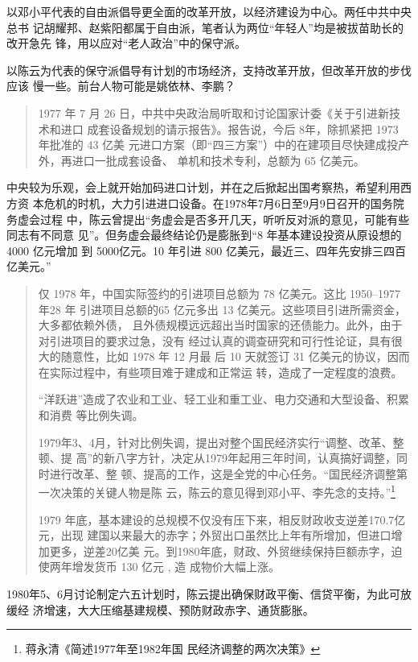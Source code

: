 以邓小平代表的自由派倡导更全面的改革开放，以经济建设为中心。两任中共中央总书
记胡耀邦、赵紫阳都属于自由派，笔者认为两位“年轻人”均是被拔苗助长的改开急先
锋，用以应对“老人政治”中的保守派。

以陈云为代表的保守派倡导有计划的市场经济，支持改革开放，但改革开放的步伐应该
慢一些。前台人物可能是姚依林、李鹏？

\begin{quotation}
  1977 年 7 月 26 日，中共中央政治局听取和讨论国家计委《关于引进新技术和进口
  成套设备规划的请示报告》。报告说，今后 8年，除抓紧把 1973 年批准的 43 亿美
  元进口方案（即“四三方案”）中的在建项目尽快建成投产外，再进口一批成套设备、
  单机和技术专利，总额为 65 亿美元。\cite{yangyuejin}
\end{quotation}
中央较为乐观，会上就开始加码进口计划，并在之后掀起出国考察热，希望利用西方资
本危机的时机，大力引进进口设备。在1978年7月6日至9月9日召开的国务院务虚会过程
中，陈云曾提出“务虚会是否多开几天，听听反对派的意见，可能有些同志有不同意
见”。但务虚会最终结论仍是膨胀到“8 年基本建设投资从原设想的 4000 亿元增加
到 5000亿元。10 年引进 800 亿美元，最近三、四年先安排三四百亿美元。”
\begin{quotation}
  仅 1978 年，中国实际签约的引进项目总额为 78 亿美元。这比 1950--1977年28 年
  引进项目总额的65 亿元多出 13 亿美元。这些项目引进所需资金，大多都依赖外债，
  且外债规模远远超出当时国家的还债能力。此外，由于对引进项目的要求过急，没有
  经过认真的调查研究和可行性论证，具有很大的随意性，比如 1978 年 12 月最
  后 10 天就签订 31 亿美元的协议，因而在实际过程中，有些项目难于建成和正常运
  转，造成了一定程度的浪费。\cite{yangyuejin}

  “洋跃进”造成了农业和工业、轻工业和重工业、电力交通和大型设备、积累和消费
  等比例失调。

  1979年3、4月，针对比例失调，提出对整个国民经济实行“调整、改革、整顿、提
  高”的新八字方针，决定从1979年起用三年时间，认真搞好调整，同时进行改革、整
  顿、提高的工作，这是全党的中心任务。“国民经济调整第一次决策的关键人物是陈
  云，陈云的意见得到邓小平、李先念的支持。”\footnote{蒋永清\quad 《简述1977年至1982年国
    民经济调整的两次决策》}

  1979 年底，基本建设的总规模不仅没有压下来，相反财政收支逆差170.7亿元，出现
  建国以来最大的赤字；外贸出口虽然比上年有所增加，但进口增加更多，逆差20亿美
  元。到1980年底，财政、外贸继续保持巨额赤字，迫使两年增发货币 130 亿元 , 造
  成物价大幅上涨。\cite{chenyunjihua}
\end{quotation}

1980年5、6月讨论制定六五计划时，陈云提出确保财政平衡、信贷平衡，为此可放缓经
济增速，大大压缩基建规模、预防财政赤字、通货膨胀。

